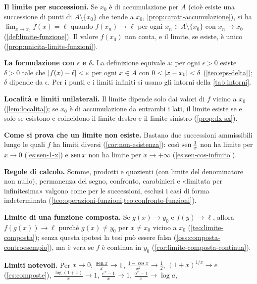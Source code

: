 \begin{puntichiave}
\item \textbf{Il limite per successioni.} Se $x_{0}$ è di accumulazione per $A$ (cioè
esiste una successione di punti di $A\setminus\{x_{0}\}$ che tende a $x_{0}$,
\cref{prop:caratt-accumulazione}), si ha $\lim_{x\to x_{0}}f(x)=\ell$ quando
$f(x_{n})\to\ell$ per ogni $x_{n}\in A\setminus\{x_{0}\}$ con $x_{n}\to x_{0}$
(\cref{def:limite-funzione}). Il valore $f(x_{0})$ non conta, e il limite, se esiste, è
unico (\cref{prop:unicita-limite-funzioni}).
\item \textbf{La formulazione con $\epsilon$ e $\delta$.} La definizione equivale a:
per ogni $\epsilon>0$ esiste $\delta>0$ tale che $\lvert f(x)-\ell\rvert<\varepsilon$ per ogni
$x\in A$ con $0<\lvert x-x_{0}\rvert<\delta$ (\cref{teo:eps-delta}); $\delta$ dipende da
$\epsilon$. Per i punti e i limiti infiniti si usano gli intorni della
\cref{tab:intorni}.
\item \textbf{Località e limiti unilaterali.} Il limite dipende solo dai valori di $f$
vicino a $x_{0}$ (\cref{lem:localita}); se $x_{0}$ è di accumulazione da entrambi i
lati, il limite esiste se e solo se esistono e coincidono il limite destro e il limite
sinistro (\cref{prop:dx-sx}).
\item \textbf{Come si prova che un limite non esiste.} Bastano due successioni
ammissibili lungo le quali $f$ ha limiti diversi (\cref{cor:non-esistenza}): così
$\operatorname{sen}\frac1x$ non ha limite per $x\to0$ (\cref{es:sen-1-x}) e $\operatorname{sen} x$ non ha limite
per $x\to+\infty$ (\cref{es:sen-cos-infinito}).
\item \textbf{Regole di calcolo.} Somme, prodotti e quozienti (con limite del
denominatore non nullo), permanenza del segno, confronto, carabinieri e «limitata per
infinitesima» valgono come per le successioni, esclusi i casi di forma indeterminata
(\cref{teo:operazioni-funzioni,teo:confronto-funzioni}).
\item \textbf{Limite di una funzione composta.} Se $g(x)\to y_{0}$ e $f(y)\to\ell$,
allora $f(g(x))\to\ell$ purché $g(x)\neq y_{0}$ per $x\neq x_{0}$ vicino a $x_{0}$
(\cref{teo:limite-composta}); senza questa ipotesi la tesi può essere falsa
(\cref{oss:composta-controesempio}), ma è vera se $f$ è continua in $y_{0}$
(\cref{cor:limite-composta-continua}).
\item \textbf{Limiti notevoli.} Per $x\to0$: $\frac{\operatorname{sen} x}{x}\to1$,
$\frac{1-\cos x}{x^{2}}\to\frac12$, $(1+x)^{1/x}\to e$ (\cref{es:composte}),
$\frac{\log(1+x)}{x}\to1$, $\frac{e^{x}-1}{x}\to1$, $\frac{a^{x}-1}{x}\to\log a$,

\end{puntichiave}
